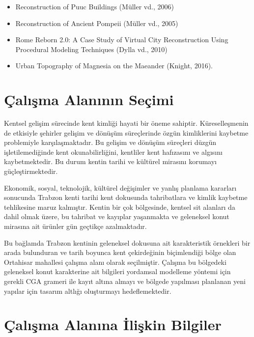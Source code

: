 \documentclass[12pt,turkish,a4paperpaper,]{report}
\providecommand{\tightlist}{%
  \setlength{\itemsep}{0pt}\setlength{\parskip}{0pt}}
\begin{document}
\begin{itemize}
\tightlist
\item
  Reconstruction of Puuc Buildings (Müller vd., 2006)
\item
  Reconstruction of Ancient Pompeii (Müller vd., 2005)
\item
  Rome Reborn 2.0: A Case Study of Virtual City Reconstruction Using
  Procedural Modeling Techniques (Dylla vd., 2010)
\item
  Urban Topography of Magnesia on the Maeander (Knight, 2016).
\end{itemize}

\hypertarget{uxe7alux131ux15fma-alanux131nux131n-seuxe7imi}{%
\section{Çalışma Alanının
Seçimi}\label{uxe7alux131ux15fma-alanux131nux131n-seuxe7imi}}

Kentsel gelişim sürecinde kent kimliği hayati bir öneme sahiptir.
Küreselleşmenin de etkisiyle şehirler gelişim ve dönüşüm süreçlerinde
özgün kimliklerini kaybetme problemiyle karşılaşmaktadır. Bu gelişim ve
dönüşüm süreçleri düzgün işletilemediğinde kent okunabilirliğini,
kentliler kent hafızasını ve algısını kaybetmektedir. Bu durum kentin
tarihi ve kültürel mirasını korumayı güçleştirmektedir.

Ekonomik, sosyal, teknolojik, kültürel değişimler ve yanlış planlama
kararları sonucunda Trabzon kenti tarihi kent dokusunda tahribatlara ve
kimlik kaybetme tehlikesine maruz kalmıştır. Kentin bir çok bölgesinde,
kentsel sit alanları da dahil olmak üzere, bu tahribat ve kayıplar
yaşanmakta ve geleneksel konut mirasına ait ürünler gün geçtikçe
azalmaktadır.

Bu bağlamda Trabzon kentinin geleneksel dokusuna ait karakteristik
örnekleri bir arada bulunduran ve tarih boyunca kent çekirdeğinin
biçimlendiği bölge olan Ortahisar mahallesi çalışma alanı olarak
seçilmiştir. Çalışma bu bölgedeki geleneksel konut karakterine ait
bilgileri yordamsal modelleme yöntemi için gerekli CGA grameri ile kayıt
altına almayı ve bölgede yapılması planlanan yeni yapılar için tasarım
altlığı oluşturmayı hedeflemektedir.

\hypertarget{uxe7alux131ux15fma-alanux131na-iliux15fkin-bilgiler}{%
\section{Çalışma Alanına İlişkin Bilgiler
}\label{uxe7alux131ux15fma-alanux131na-iliux15fkin-bilgiler}}
\end{document}
